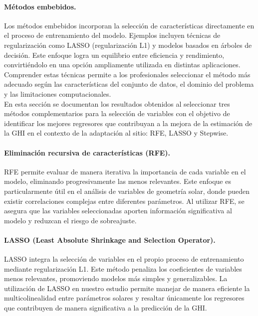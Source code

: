 \paragraph{Métodos embebidos.} Los métodos embebidos incorporan la selección de características directamente en el proceso de entrenamiento del modelo. Ejemplos incluyen técnicas de regularización como LASSO (regularización L1) y modelos basados en árboles de decisión. Este enfoque logra un equilibrio entre eficiencia y rendimiento, convirtiéndolo en una opción ampliamente utilizada en distintas aplicaciones. \\

Comprender estas técnicas permite a los profesionales seleccionar el método más adecuado según las características del conjunto de datos, el dominio del problema y las limitaciones computacionales.\\

En esta sección se documentan los resultados obtenidos al seleccionar tres métodos complementarios para la selección de variables con el objetivo de identificar los mejores regresores que contribuyan a la mejora de la estimación de la GHI en el contexto de la adaptación al sitio: RFE, LASSO y Stepwise.  

\paragraph{Eliminación recursiva de características (RFE).} RFE permite evaluar de manera iterativa la importancia de cada variable en el modelo, eliminando progresivamente las menos relevantes. Este enfoque es particularmente útil en el análisis de variables de geometría solar, donde pueden existir correlaciones complejas entre diferentes parámetros. Al utilizar RFE, se asegura que las variables seleccionadas aporten información significativa al modelo y reduzcan el riesgo de sobreajuste.  

\paragraph{LASSO (Least Absolute Shrinkage and Selection Operator).} LASSO integra la selección de variables en el propio proceso de entrenamiento mediante regularización L1. Este método penaliza los coeficientes de variables menos relevantes, promoviendo modelos más simples y generalizables. La utilización de LASSO en nuestro estudio permite manejar de manera eficiente la multicolinealidad entre parámetros solares y resaltar únicamente los regresores que contribuyen de manera significativa a la predicción de la GHI.  

